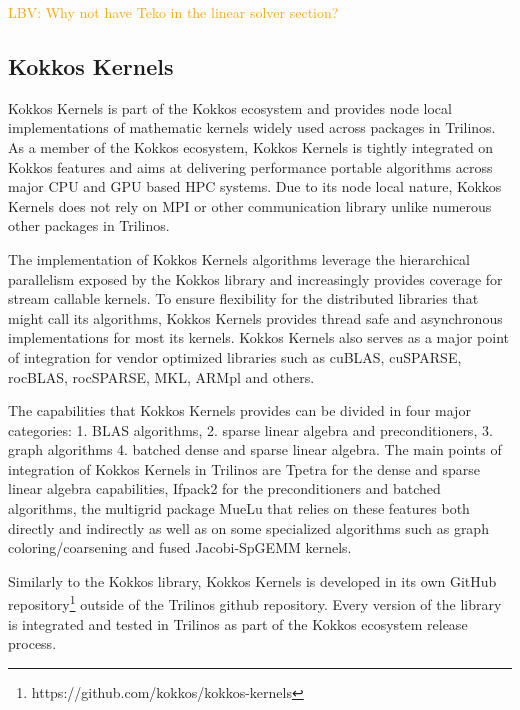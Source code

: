 
\textcolor{orange}{ LBV: Why not have Teko in the linear solver section?}

\subsection{Kokkos Kernels}\label{subsec:kk}
Kokkos Kernels is part of the Kokkos ecosystem and provides node local implementations
of mathematic kernels widely used across packages in Trilinos. As a member of the Kokkos
ecosystem, Kokkos Kernels is tightly integrated on Kokkos features and aims at
delivering performance portable algorithms across major CPU and GPU based HPC systems.
Due to its node local nature, Kokkos Kernels does not rely on MPI or other communication
library unlike numerous other packages in Trilinos.

The implementation of Kokkos Kernels algorithms leverage the hierarchical parallelism
exposed by the Kokkos library and increasingly provides coverage for stream callable
kernels. To ensure flexibility for the distributed libraries that might call its
algorithms, Kokkos Kernels provides thread safe and asynchronous implementations for
most its kernels. Kokkos Kernels also serves as a major point of integration for vendor
optimized libraries such as cuBLAS, cuSPARSE, rocBLAS, rocSPARSE, MKL, ARMpl and others.

The capabilities that Kokkos Kernels provides can be divided in four major categories:
1. BLAS algorithms, 2. sparse linear algebra and preconditioners, 3. graph algorithms
4. batched dense and sparse linear algebra. The main points of integration of Kokkos
Kernels in Trilinos are Tpetra for the dense and sparse linear algebra capabilities,
Ifpack2 for the preconditioners and batched algorithms, the multigrid package MueLu
that relies on these features both directly and indirectly as well as on some
specialized algorithms such as graph coloring/coarsening and fused Jacobi-SpGEMM kernels.

Similarly to the Kokkos library, Kokkos Kernels is developed in its own GitHub repository\footnote{https://github.com/kokkos/kokkos-kernels}
outside of the Trilinos github repository. Every version of the library is integrated
and tested in Trilinos as part of the Kokkos ecosystem release process.
